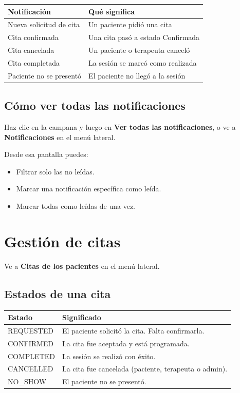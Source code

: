\documentclass[12pt,a4paper]{article}
\begin{document}
\begin{tabular}{@{}ll@{}}
  \toprule
  \textbf{Notificación} & \textbf{Qué significa} \\
  \midrule
  Nueva solicitud de cita & Un paciente pidió una cita \\
  Cita confirmada & Una cita pasó a estado Confirmada \\
  Cita cancelada & Un paciente o terapeuta canceló \\
  Cita completada & La sesión se marcó como realizada \\
  Paciente no se presentó & El paciente no llegó a la sesión \\
  \bottomrule
\end{tabular}

\subsection{Cómo ver todas las notificaciones}

Haz clic en la campana y luego en \textbf{Ver todas las notificaciones}, o
ve a \textbf{Notificaciones} en el menú lateral.

Desde esa pantalla puedes:
\begin{itemize}
  \item Filtrar solo las no leídas.
  \item Marcar una notificación específica como leída.
  \item Marcar todas como leídas de una vez.
\end{itemize}

\section{Gestión de citas}

Ve a \textbf{Citas de los pacientes} en el menú lateral.

\subsection{Estados de una cita}

\begin{tabular}{@{}lp{9cm}@{}}
  \toprule
  \textbf{Estado} & \textbf{Significado} \\
  \midrule
  REQUESTED   & El paciente solicitó la cita. Falta confirmarla. \\
  CONFIRMED   & La cita fue aceptada y está programada. \\
  COMPLETED   & La sesión se realizó con éxito. \\
  CANCELLED   & La cita fue cancelada (paciente, terapeuta o admin). \\
  NO\_SHOW    & El paciente no se presentó. \\
  \bottomrule
\end{tabular}
\end{document}
